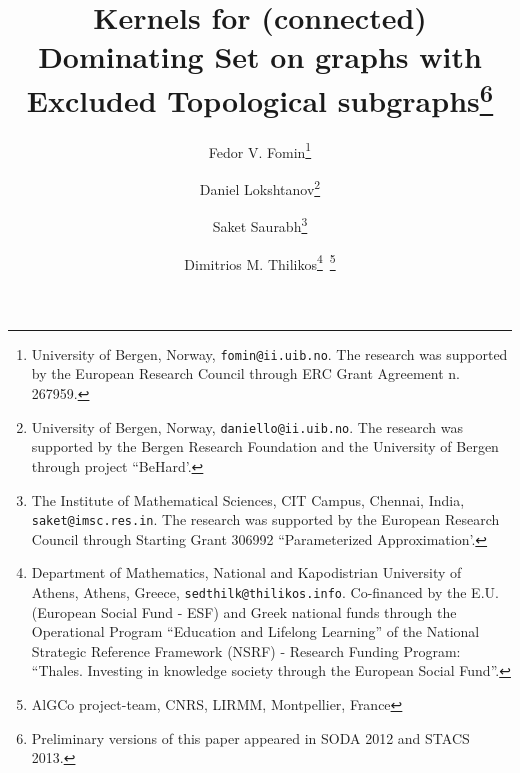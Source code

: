 \documentclass[11pt]{article}
\begin{document}
\title{Kernels for (connected) Dominating Set on  graphs with \\ Excluded Topological subgraphs\thanks{Preliminary versions of this paper appeared in SODA 2012 and STACS 2013. }}
\author{Fedor V. Fomin\thanks{University of Bergen, Norway, \texttt{fomin@ii.uib.no}.  The research was supported by the European Research Council through ERC Grant Agreement n. 267959.}
\and 
Daniel Lokshtanov\thanks{University of Bergen, Norway, \texttt{daniello@ii.uib.no}. The research was supported by the Bergen Research Foundation and the University of Bergen through project ``BeHard'.}
\and
Saket Saurabh\thanks{The Institute of Mathematical Sciences, CIT Campus, Chennai, India, \texttt{saket@imsc.res.in}. 
The research was supported by the European Research Council through Starting Grant 306992 ``Parameterized Approximation'.}
\and 
Dimitrios M. Thilikos\thanks{Department of Mathematics, National and Kapodistrian University of Athens, Athens, Greece,  \texttt{sedthilk@thilikos.info}. Co-financed by the E.U. (European Social Fund - ESF) and Greek national funds through the Operational Program ``Education and Lifelong Learning'' of the National Strategic Reference Framework (NSRF) - Research Funding Program: ``Thales. Investing in knowledge society through the European Social Fund''.}~\thanks{AlGCo project-team, CNRS, LIRMM, Montpellier, France}}
\date{}
\maketitle
\thispagestyle{empty}
\end{document}
